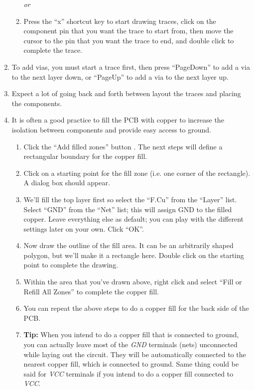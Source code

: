 \documentclass[12pt,letterpaper]{scrartcl}
\begin{document}
\begin{enumerate}
\begin{enumerate}
			\textit{or}
			
			\item Press the ``x'' shortcut key to start drawing traces, click on the component pin that you want the trace to start from, then move the cursor to the pin that you want the trace to end, and double click to complete the trace.
			
		\end{enumerate}
	\item To add vias, you must start a trace first, then press ``PageDown'' to add a via to the next layer down, or ``PageUp'' to add a via to the next layer up. 
	
	\item Expect a lot of going back and forth between layout the traces and placing the components. 
	
	\item It is often a good practice to fill the PCB with copper to increase the isolation between components and provide easy access to ground. 
		\begin{enumerate}
			\item Click the ``Add filled zones'' button . The next steps will define a rectangular boundary for the copper fill. 
			
			\item Click on a starting point for the fill zone (i.e. one corner of the rectangle). A dialog box should appear. 
			
			\item We'll fill the top layer first so select the ``F.Cu'' from the ``Layer'' list. Select ``GND'' from the ``Net'' list; this will assign GND to the filled copper. Leave everything else as default; you can play with the different settings later on your own. Click ``OK''.
			
			\item Now draw the outline of the fill area. It can be an arbitrarily shaped polygon, but we'll make it a rectangle here. Double click on the starting point to complete the drawing. 
			
			\item Within the area that you've drawn above, right click and select ``Fill or Refill All Zones'' to complete the copper fill. 
			
			\item You can repeat the above steps to do a copper fill for the back side of the PCB. 
			
			\item \textbf{Tip:} When you intend to do a copper fill that is connected to ground, you can actually leave most of the \emph{GND} terminals (nets) unconnected while laying out the circuit. They will be automatically connected to the nearest copper fill, which is connected to ground. Same thing could be said for \emph{VCC} terminals if you intend to do a copper fill connected to \emph{VCC}. 
						

\end{enumerate}
\end{enumerate}
\end{document}
